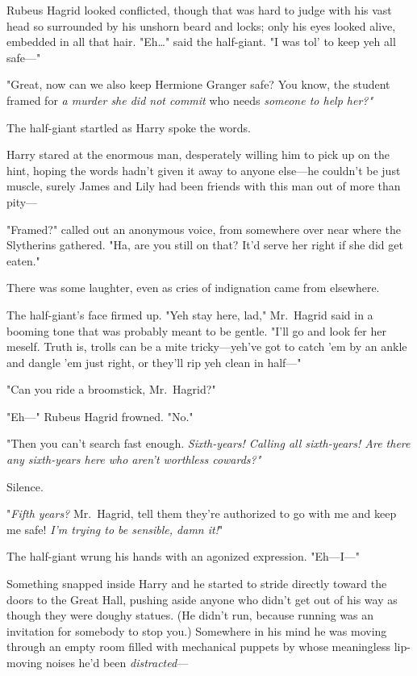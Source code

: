 Rubeus Hagrid looked conflicted, though that was hard to judge with his vast head so surrounded by his unshorn beard and locks; only his eyes looked alive, embedded in all that hair. "Eh{\ldots}" said the half-giant. "I was tol' to keep yeh all safe---"

"Great, now can we also keep Hermione Granger safe? You know, the student framed for \emph{a murder she did not commit} who needs \emph{someone to help her?"}

The half-giant startled as Harry spoke the words.

Harry stared at the enormous man, desperately willing him to pick up on the hint, hoping the words hadn't given it away to anyone else---he couldn't be just muscle, surely James and Lily had been friends with this man out of more than pity---

"Framed?" called out an anonymous voice, from somewhere over near where the Slytherins gathered. "Ha, are you still on that? It'd serve her right if she did get eaten."

There was some laughter, even as cries of indignation came from elsewhere.

The half-giant's face firmed up. "Yeh stay here, lad," Mr.~Hagrid said in a booming tone that was probably meant to be gentle. "I'll go and look fer her meself. Truth is, trolls can be a mite tricky---yeh've got to catch 'em by an ankle and dangle 'em just right, or they'll rip yeh clean in half---"

"Can you ride a broomstick, Mr.~Hagrid?"

"Eh---" Rubeus Hagrid frowned. "No."

"Then you can't search fast enough. \emph{Sixth-years! Calling all sixth-years! Are there any sixth-years here who aren't worthless cowards?"}

Silence.

"\emph{Fifth years?} Mr.~Hagrid, tell them they're authorized to go with me and keep me safe! \emph{I'm trying to be sensible, damn it!}"

The half-giant wrung his hands with an agonized expression. "Eh---I---"

Something snapped inside Harry and he started to stride directly toward the doors to the Great Hall, pushing aside anyone who didn't get out of his way as though they were doughy statues. (He didn't run, because running was an invitation for somebody to stop you.) Somewhere in his mind he was moving through an empty room filled with mechanical puppets by whose meaningless lip-moving noises he'd been \emph{distracted}---

